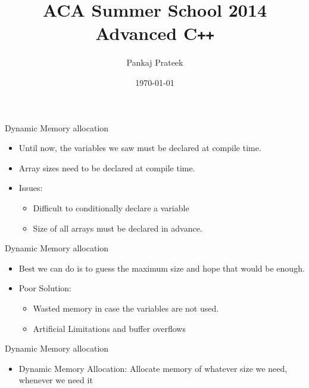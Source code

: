 \documentclass{beamer}
\title{ACA Summer School 2014\\ Advanced C\texttt{++}}
\author{Pankaj Prateek}
\institute{ACA, CSE, IIT Kanpur}
\date{\today}
\begin{document}
\begin{frame}
  \titlepage
\end{frame}

\begin{frame}[fragile]{Dynamic Memory allocation}
  \begin{itemize}
    \item Until now, the variables we saw must be declared at compile time.\pause
    \item Array sizes need to be declared at compile time.\pause
    \item Issues:\pause
      \begin{itemize}
      \item Difficult to conditionally declare a variable\pause
      \item Size of all arrays must be declared in advance.
      \end{itemize}
  \end{itemize}
\end{frame}

\begin{frame}[fragile]{Dynamic Memory allocation}
  \begin{itemize}
    \item Best we can do is to guess the maximum size and hope that would be enough.\pause
    \item Poor Solution:\pause
      \begin{itemize}
        \item Wasted memory in case the variables are not used.\pause
        \item Artificial Limitations and buffer overflows
      \end{itemize}
  \end{itemize}
\end{frame}

\begin{frame}[fragile]{Dynamic Memory allocation}
  \begin{itemize}
    \item Dynamic Memory Allocation: Allocate memory of whatever size we need, whenever we need it
  \end{itemize}
\end{frame}
\end{document}
